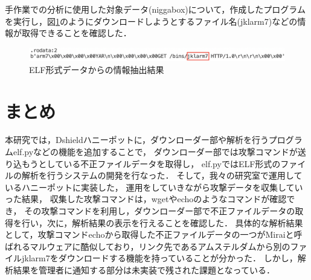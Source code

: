 \documentclass[dvipdfmx]{bta}
\begin{document}




手作業での分析に使用した対象データ(niggabox)について，作成したプログラムを実行し，図\ref{fig:jklarm7}のようにダウンロードしようとするファイル名(jklarm7)などの情報が取得できることを確認した．


\begin{figure}[htbp]
	\centering
 	\includegraphics[scale = 0.6]
	{jklarm7.png}
 	\caption{ELF形式データからの情報抽出結果}\label{fig:jklarm7}
\end{figure}


\chapter{まとめ}

本研究では，Dshieldハニーポットに，ダウンローダー部や解析を行うプログラムelf.pyなどの機能を追加することで，
ダウンローダー部では攻撃コマンドが送り込もうとしている不正ファイルデータを取得し，
elf.pyではELF形式のファイルの解析を行うシステムの開発を行なった．
そして，我々の研究室で運用しているハニーポットに実装した，
運用をしていきながら攻撃データを収集していった結果，
収集した攻撃コマンドは，wgetやechoのようなコマンドが確認でき，
その攻撃コマンドを利用し，ダウンローダー部で不正ファイルデータの取得を行い，次に，解析結果の表示を行えることを確認した．
具体的な解析結果として，攻撃コマンドechoから取得した不正ファイルデータの一つがMiraiと呼ばれるマルウェアに酷似しており，リンク先であるアムステルダムから別のファイルjklarm7をダウンロードする機能を持っていることが分かった．
しかし，解析結果を管理者に通知する部分は未実装で残された課題となっている．
\end{document}
